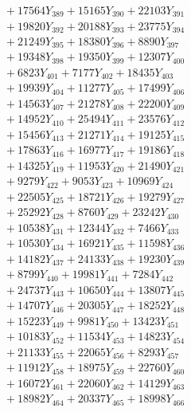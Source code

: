 \documentclass[a4paper,10pt]{article}
\begin{document}
{\begin{align}
&\;  + 17564 Y_{389} + 15165 Y_{390} + 22103 Y_{391} \\[0.3ex]
&\;  + 19820 Y_{392} + 20188 Y_{393} + 23775 Y_{394} \\[0.3ex]
&\;  + 21249 Y_{395} + 18380 Y_{396} + 8890 Y_{397} \\[0.3ex]
&\;  + 19348 Y_{398} + 19350 Y_{399} + 12307 Y_{400} \\[0.3ex]
&\;  + 6823 Y_{401} + 7177 Y_{402} + 18435 Y_{403} \\[0.3ex]
&\;  + 19939 Y_{404} + 11277 Y_{405} + 17499 Y_{406} \\[0.3ex]
&\;  + 14563 Y_{407} + 21278 Y_{408} + 22200 Y_{409} \\[0.3ex]
&\;  + 14952 Y_{410} + 25494 Y_{411} + 23576 Y_{412} \\[0.3ex]
&\;  + 15456 Y_{413} + 21271 Y_{414} + 19125 Y_{415} \\[0.3ex]
&\;  + 17863 Y_{416} + 16977 Y_{417} + 19186 Y_{418} \\[0.5ex]\allowbreak
&\;  + 14325 Y_{419} + 11953 Y_{420} + 21490 Y_{421} \\[0.3ex]
&\;  + 9279 Y_{422} + 9053 Y_{423} + 10969 Y_{424} \\[0.3ex]
&\;  + 22505 Y_{425} + 18721 Y_{426} + 19279 Y_{427} \\[0.3ex]
&\;  + 25292 Y_{428} + 8760 Y_{429} + 23242 Y_{430} \\[0.3ex]
&\;  + 10538 Y_{431} + 12344 Y_{432} + 7466 Y_{433} \\[0.3ex]
&\;  + 10530 Y_{434} + 16921 Y_{435} + 11598 Y_{436} \\[0.3ex]
&\;  + 14182 Y_{437} + 24133 Y_{438} + 19230 Y_{439} \\[0.3ex]
&\;  + 8799 Y_{440} + 19981 Y_{441} + 7284 Y_{442} \\[0.3ex]
&\;  + 24737 Y_{443} + 10650 Y_{444} + 13807 Y_{445} \\[0.3ex]
&\;  + 14707 Y_{446} + 20305 Y_{447} + 18252 Y_{448} \\[0.5ex]\allowbreak
&\;  + 15223 Y_{449} + 9981 Y_{450} + 13423 Y_{451} \\[0.3ex]
&\;  + 10183 Y_{452} + 11534 Y_{453} + 14823 Y_{454} \\[0.3ex]
&\;  + 21133 Y_{455} + 22065 Y_{456} + 8293 Y_{457} \\[0.3ex]
&\;  + 11912 Y_{458} + 18975 Y_{459} + 22760 Y_{460} \\[0.3ex]
&\;  + 16072 Y_{461} + 22060 Y_{462} + 14129 Y_{463} \\[0.3ex]
&\;  + 18982 Y_{464} + 20337 Y_{465} + 18998 Y_{466} \\[0.3ex]

\end{align}}
\end{document}
